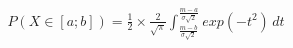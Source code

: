 \documentclass[preview]{standalone}
\begin{document}
\begin{align*}
{P( X \in [a;b] ) = { \frac{1}{2}} } \times { \frac{2}{\sqrt{\pi}} } \int_{ \frac{m - b}{\sigma \sqrt{2}} }^{ \frac{m - a}{\sigma \sqrt{2}} } { exp( -t^2 ) } \, dt
\end{align*}
\end{document}
